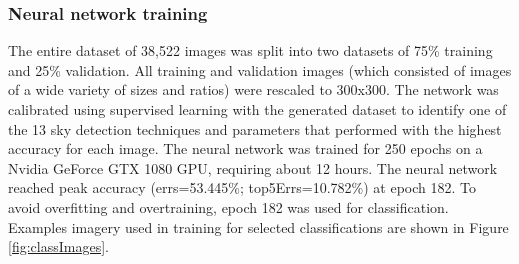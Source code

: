 \documentclass[final,3p,times,authoryear]{elsarticle}
\begin{document}
\subsubsection{Neural network training}\label{sec:nntraining}    

The entire dataset of 38,522 images was split into two datasets of 75\% training and 25\% validation. All training and validation images (which consisted of images of a wide variety of sizes and ratios) were rescaled to 300x300. The network was calibrated using supervised learning with the generated dataset to identify one of the 13 sky detection techniques and parameters that performed with the highest accuracy for each image. The neural network was trained for 250 epochs on a Nvidia GeForce GTX 1080 GPU, requiring about 12 hours. The neural network reached peak accuracy (errs=53.445\%; top5Errs=10.782\%) at epoch 182. To avoid overfitting and overtraining, epoch 182 was used for classification. Examples imagery used in training for selected classifications are shown in Figure \ref{fig:classImages}.

\end{document}
